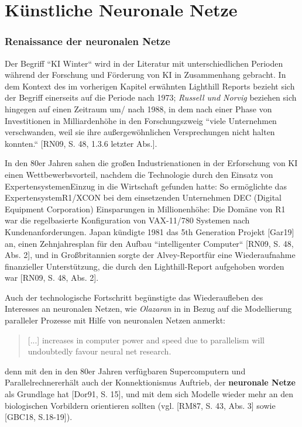 \chapter{Künstliche Neuronale Netze}


\subsection{Renaissance der neuronalen Netze}

Der Begriff ``KI Winter`` wird in der Literatur mit unterschiedlichen Perioden während der Forschung und Förderung von KI in Zusammenhang gebracht. In dem Kontext des im vorherigen Kapitel erwähnten Lighthill Reports bezieht sich der Begriff einerseits auf die Periode nach 1973\footnotemark[1] [Jon08, S. 8 f.]; \textit{Russell und Norvig} beziehen sich hingegen auf einen Zeitraum um/ nach 1988, in dem nach einer Phase von Investitionen in Milliardenhöhe in den Forschungszweig ``viele Unternehmen verschwanden, weil sie ihre außergewöhnlichen Versprechungen nicht halten konnten.`` [RN09, S. 48, 1.3.6 letzter Abs.]\footnotemark[2].

In den 80er Jahren sahen die großen Industrienationen in der Erforschung von KI einen Wettbewerbsvorteil, nachdem die Technologie durch den Einsatz von Expertensystemen\footnotemark[3] Einzug in die Wirtschaft gefunden hatte: So ermöglichte das Expertensystem\footnotemark[4] R1/XCON bei dem einsetzenden Unternehmen DEC (Digital Equipment Corporation) Einsparungen in Millionenhöhe\footnotemark[5] [RN, S. 48]: Die Domäne von R1 war die regelbasierte Konfiguration von VAX-11/780 Systemen nach Kundenanforderungen\footnotemark[6]. Japan kündigte 1981 das 5th Generation Projekt [Gar19] an, einen Zehnjahresplan für den Aufbau ``intelligenter Computer`` [RN09, S. 48, Abs. 2]\footnotemark[7], und in Großbritannien sorgte der Alvey-Report\footnotemark[8] für eine Wiederaufnahme finanzieller Unterstützung, die durch den Lighthill-Report aufgehoben worden war [RN09, S. 48, Abs. 2]\footnotemark[9].

Auch der technologische Fortschritt begünstigte das Wiederaufleben des Interesses an neuronalen Netzen, wie \textit{Olazaran} in  in Bezug auf die Modellierung paralleler Prozesse mit Hilfe von neuronalen Netzen anmerkt:

\blockquote{
    [...] increases in computer power and speed due to parallelism will undoubtedly favour neural net research.
}

denn mit den in den 80er Jahren verfügbaren Supercomputern und Parallelrechner\footnotemark[10] erhält auch der Konnektionismus Auftrieb, der \textbf{neuronale Netze} als Grundlage hat [Dor91, S. 15], und mit dem sich Modelle wieder mehr an den biologischen Vorbildern orientieren sollten (vgl. [RM87, S. 43, Abs. 3] sowie [GBC18, S.18-19]).



